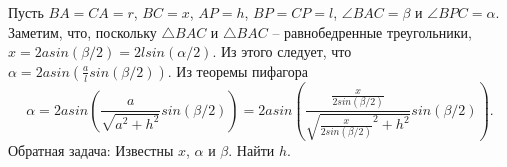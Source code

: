 Пусть $BA=CA=r$, $BC=x$, $AP=h$, $BP=CP=l$, $\angle BAC=\beta$ и $\angle BPC=\alpha$. Заметим, что, поскольку $\triangle BAC$ и $\triangle BAC$ -- равнобедренные треугольники, $x=2 a sin(\beta/2)=2 l sin(\alpha/2)$. Из этого следует, что $\alpha=2asin(\frac{a}{l} sin(\beta/2))$. Из теоремы пифагора
\begin{equation}
\displaystyle \alpha=2asin(\frac{a}{\sqrt{a^2+h^2}} sin(\beta/2))=2asin(\frac{\frac{x}{2sin(\beta/2)}}{\sqrt{{\frac{x}{2sin(\beta/2)}}^2+h^2}} sin(\beta/2)).
\end{equation}
Обратная задача:
Известны $x$, $\alpha$ и $\beta$. Найти $h$.